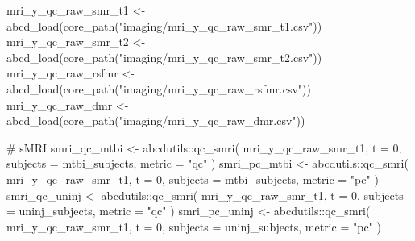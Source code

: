 \documentclass[
  letterpaper,
  DIV=11,
  numbers=noendperiod]{scrreprt}
\newenvironment{Shaded}{\begin{snugshade}}{\end{snugshade}}
\newcommand{\AttributeTok}[1]{\textcolor[rgb]{0.40,0.45,0.13}{#1}}
\newcommand{\CommentTok}[1]{\textcolor[rgb]{0.37,0.37,0.37}{#1}}
\newcommand{\DecValTok}[1]{\textcolor[rgb]{0.68,0.00,0.00}{#1}}
\newcommand{\FunctionTok}[1]{\textcolor[rgb]{0.28,0.35,0.67}{#1}}
\newcommand{\NormalTok}[1]{\textcolor[rgb]{0.00,0.23,0.31}{#1}}
\newcommand{\OtherTok}[1]{\textcolor[rgb]{0.00,0.23,0.31}{#1}}
\newcommand{\SpecialCharTok}[1]{\textcolor[rgb]{0.37,0.37,0.37}{#1}}
\newcommand{\StringTok}[1]{\textcolor[rgb]{0.13,0.47,0.30}{#1}}
\begin{document}
\begin{Shaded}
\begin{Highlighting}[]
\NormalTok{mri\_y\_qc\_raw\_smr\_t1 }\OtherTok{\textless{}{-}} \FunctionTok{abcd\_load}\NormalTok{(}\FunctionTok{core\_path}\NormalTok{(}\StringTok{"imaging/mri\_y\_qc\_raw\_smr\_t1.csv"}\NormalTok{))}
\NormalTok{mri\_y\_qc\_raw\_smr\_t2 }\OtherTok{\textless{}{-}} \FunctionTok{abcd\_load}\NormalTok{(}\FunctionTok{core\_path}\NormalTok{(}\StringTok{"imaging/mri\_y\_qc\_raw\_smr\_t2.csv"}\NormalTok{))}
\NormalTok{mri\_y\_qc\_raw\_rsfmr }\OtherTok{\textless{}{-}} \FunctionTok{abcd\_load}\NormalTok{(}\FunctionTok{core\_path}\NormalTok{(}\StringTok{"imaging/mri\_y\_qc\_raw\_rsfmr.csv"}\NormalTok{))}
\NormalTok{mri\_y\_qc\_raw\_dmr }\OtherTok{\textless{}{-}} \FunctionTok{abcd\_load}\NormalTok{(}\FunctionTok{core\_path}\NormalTok{(}\StringTok{"imaging/mri\_y\_qc\_raw\_dmr.csv"}\NormalTok{))}

\CommentTok{\# sMRI}
\NormalTok{smri\_qc\_mtbi }\OtherTok{\textless{}{-}}\NormalTok{ abcdutils}\SpecialCharTok{::}\FunctionTok{qc\_smri}\NormalTok{(}
\NormalTok{    mri\_y\_qc\_raw\_smr\_t1,}
    \AttributeTok{t =} \DecValTok{0}\NormalTok{,}
    \AttributeTok{subjects =}\NormalTok{ mtbi\_subjects,}
    \AttributeTok{metric =} \StringTok{"qc"}
\NormalTok{)}
\NormalTok{smri\_pc\_mtbi }\OtherTok{\textless{}{-}}\NormalTok{ abcdutils}\SpecialCharTok{::}\FunctionTok{qc\_smri}\NormalTok{(}
\NormalTok{    mri\_y\_qc\_raw\_smr\_t1,}
    \AttributeTok{t =} \DecValTok{0}\NormalTok{,}
    \AttributeTok{subjects =}\NormalTok{ mtbi\_subjects,}
    \AttributeTok{metric =} \StringTok{"pc"}
\NormalTok{)}
\NormalTok{smri\_qc\_uninj }\OtherTok{\textless{}{-}}\NormalTok{ abcdutils}\SpecialCharTok{::}\FunctionTok{qc\_smri}\NormalTok{(}
\NormalTok{    mri\_y\_qc\_raw\_smr\_t1,}
    \AttributeTok{t =} \DecValTok{0}\NormalTok{,}
    \AttributeTok{subjects =}\NormalTok{ uninj\_subjects,}
    \AttributeTok{metric =} \StringTok{"qc"}
\NormalTok{)}
\NormalTok{smri\_pc\_uninj }\OtherTok{\textless{}{-}}\NormalTok{ abcdutils}\SpecialCharTok{::}\FunctionTok{qc\_smri}\NormalTok{(}
\NormalTok{    mri\_y\_qc\_raw\_smr\_t1,}
    \AttributeTok{t =} \DecValTok{0}\NormalTok{,}
    \AttributeTok{subjects =}\NormalTok{ uninj\_subjects,}
    \AttributeTok{metric =} \StringTok{"pc"}
\NormalTok{)}


\end{Highlighting}
\end{Shaded}
\end{document}
